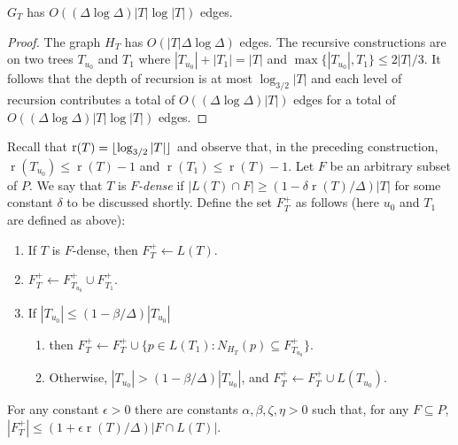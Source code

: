 \documentclass{patmorin}
\DeclareMathOperator{\rank}{r}
\begin{document}
\begin{clm}
  $G_{T}$ has $O((\Delta\log\Delta)|T|\log |T|)$ edges.
\end{clm}

\begin{proof}
  The graph $H_T$ has
  $O(|T|\Delta\log\Delta)$ edges.  The recursive constructions are on two trees $T_{u_0}$
  and $T_1$ where $|T_{u_0}|+|T_1|=|T|$ and $\max\{|T_{u_0}|,T_1\}\le
  2|T|/3$. It follows that the depth of recursion is at most
  $\log_{3/2}|T|$ and each level of recursion contributes a total of
  $O((\Delta\log\Delta)|T|)$ edges for a total of $O((\Delta\log\Delta)|T|\log|T|)$ edges.
\end{proof}

Recall that $\rank(T)=\floor{\log_{3/2} |T|}$ and observe that, in
the preceding construction, $\rank(T_{u_0}) \le \rank(T)-1$ and
$\rank(T_1)\le\rank(T)-1$.  Let $F$ be an arbitrary subset of $P$.  We say
that $T$ is \emph{$F$-dense} if $|L(T)\cap F|\ge (1-\delta\rank(T)/\Delta)|T|$
for some constant $\delta$ to be discussed shortly.  Define the set
$F^+_T$ as follows (here $u_0$ and $T_1$ are defined as above):

\begin{enumerate}
  \item If $T$ is $F$-dense, then $F^+_T\gets L(T)$.
  \item $F^+_T\gets F^+_{T_{u_0}}\cup F^+_{T_1}$.
  \item If $|T_{u_0}|\le (1-\beta/\Delta)|T_{u_0}|$
  \begin{enumerate}
     \item then $F^+_T\gets F^+_T\cup\{p\in L(T_1): N_{H_T}(p)\subseteq
     F^+_{T_{u_0}}\}$.
     \item Otherwise, $|T_{u_0}|> (1-\beta/\Delta)|T_{u_0}|$, and $F^+_T\gets F^+_T\cup L(T_{u_0})$.
  \end{enumerate}
\end{enumerate}

\begin{clm}
   For any constant $\epsilon>0$ there are constants $\alpha,\beta,\zeta,\eta >0$ such that, for any $F\subseteq P$,  $|F^+_T| \le (1+\epsilon\rank(T)/\Delta)|F\cap L(T)|$.
\end{clm}
\end{document}
